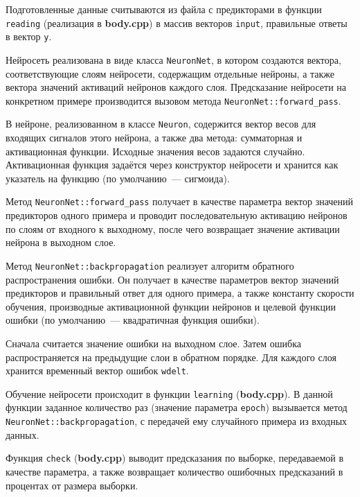 	Подготовленные данные считываются из файла с предикторами в функции \texttt{reading} (реализация в \textbf{body.cpp}) в массив
	векторов \texttt{input}, правильные ответы в вектор \texttt{y}.

	Нейросеть реализована в виде класса \texttt{NeuronNet}, в котором создаются вектора, соответствующие слоям нейросети,
	содержащим отдельные нейроны, а также вектора значений активаций нейронов каждого слоя. Предсказание
	нейросети на конкретном примере производится вызовом метода \texttt{NeuronNet::forward\_pass}.

	В нейроне, реализованном в классе \texttt{Neuron}, содержится вектор весов для входящих сигналов этого нейрона,
	а также два метода: сумматорная и активационная функции. Исходные значения весов задаются случайно. Активационная функция
	задаётся через конструктор нейросети и хранится как указатель на функцию (по умолчанию~--- сигмоида).

	Метод \texttt{NeuronNet::forward\_pass} получает в качестве параметра вектор значений предикторов одного примера и проводит последовательную
	активацию нейронов по слоям от входного к выходному, после чего возвращает значение активации нейрона в выходном слое.

	Метод \texttt{NeuronNet::backpropagation} реализует алгоритм обратного распространения ошибки.
	Он получает в качестве параметров вектор значений предикторов и правильный ответ для одного примера, а также константу скорости
	обучения, производные активационной функции нейронов и целевой функции ошибки (по умолчанию~--- квадратичная функция ошибки).

	Сначала считается значение ошибки на выходном слое.	Затем ошибка распространяется на предыдущие слои в обратном порядке.
	Для каждого слоя хранится временный вектор ошибок \texttt{wdelt}.

	Обучение нейросети происходит в функции \texttt{learning} (\textbf{body.cpp}).
	В данной функции заданное количество раз (значение параметра \texttt{epoch}) вызывается метод \texttt{NeuronNet::backpropagation},
	с передачей ему случайного примера из входных данных.

	Функция \texttt{check} (\textbf{body.cpp}) выводит предсказания по выборке, передаваемой в качестве параметра, а также возвращает
	количество ошибочных предсказаний в процентах от размера выборки.